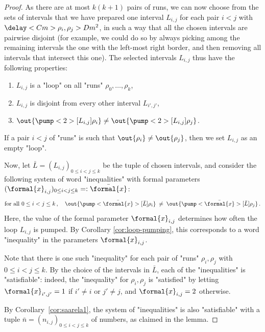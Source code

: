 \documentclass{theoretics}
\begin{document}
\begin{proof}
As there are at most $k (k+1)$ pairs of runs, 
we can now choose from the sets of intervals that we have prepared 
one interval $L_{i,j}$ for each pair $i<j$ with $\delay<C m>{\rho_i,\rho_j} > D m^2$,
in such a way that all the chosen intervals are pairwise disjoint 
(for example, we could do so by always picking among the remaining intervals 
the one with the left-most right border, and then removing all intervals 
that intersect this one).
The selected intervals $L_{i,j}$ thus have the following properties:
\begin{enumerate}
\item $L_{i,j}$ is a "loop" on all "runs" $\rho_0,\dots,\rho_k$,
\item $L_{i,j}$ is disjoint from every other interval $L_{i',j'}$,
\item $\out{\pump<2>[L_{i,j}]{\rho_i}} \neq \out{\pump<2>[L_{i,j}]{\rho_j}}$.
\end{enumerate}
%
If a pair $i<j$ of "runs" is such that 
$\out{\rho_i} \neq \out{\rho_j}$, 
then we set $L_{i,j}$ as an empty "loop". 

Now, let $\bar{L} = (L_{i,j})_{0 \le i < j \le k}$ be the tuple of chosen intervals, and consider the following system of word "inequalities" with formal parameters $(\formal{x}_{i,j})_{0\le i < j \le k} =: \bar{\formal{x}}$:
\[
  \text{for all } 0\le i<j\le k\,, \quad 
  \out{\pump<\bar{\formal{x}}>[\bar L]{\rho_i}} 
  \:\neq\:
  \out{\pump<\bar{\formal{x}}>[\bar L]{\rho_j}} \, .
\]
Here, the value of the formal parameter $\formal{x}_{i,j}$ determines how often the loop $L_{i,j}$ is pumped. By Corollary \ref{cor:loop-pumping}, this corresponds to a word "inequality" in the parameters $\formal{x}_{i,j}$.

Note that there is one such "inequality" for each pair of "runs" $\rho_i,\rho_j$ with $0 \le i < j \le k$. 
By the choice of the intervals in $\bar{L}$, each of the "inequalities" is "satisfiable": 
indeed, the "inequality" for $\rho_i,\rho_j$ is "satisfied" by letting 
$\formal{x}_{i',j'} = 1$ if $i' \not = i$ or $j' \not = j$, and
$\formal{x}_{i,j} = 2$ otherwise. 

By Corollary~\ref{cor:saarela1}, the system of "inequalities" is also "satisfiable" with a tuple $\bar n = (n_{i,j})_{0 \le i < j \le k}$ of numbers, as claimed in the lemma.
\end{proof}
\end{document}
